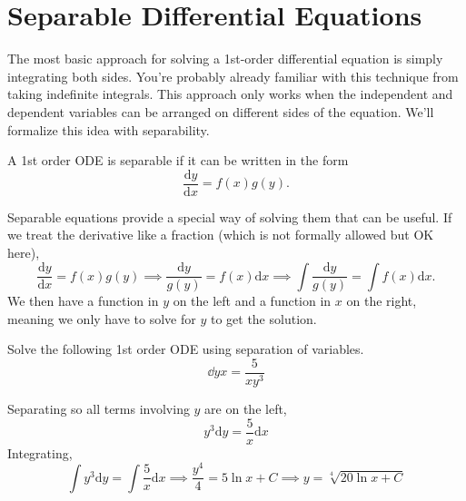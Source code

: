 \section{Separable Differential Equations}
\noindent
The most basic approach for solving a 1st-order differential equation is simply integrating both sides.
You're probably already familiar with this technique from taking indefinite integrals.
This approach only works when the independent and dependent variables can be arranged on different sides of the equation. 
We'll formalize this idea with separability.

\begin{definition}
	A 1st order ODE is separable if it can be written in the form
	\begin{equation*}
		\frac{\mathrm{d} y}{\mathrm{d} x} = f(x)g(y).
	\end{equation*}
\end{definition}

\noindent
Separable equations provide a special way of solving them that can be useful.
If we treat the derivative like a fraction (which is not formally allowed but OK here),
\begin{equation*}
	\frac{\mathrm{d} y}{\mathrm{d} x} = f(x)g(y) \implies \frac{\mathrm{d} y}{g(y)} = f(x) \mathrm{d}x \implies \int{\frac{\mathrm{d} y}{g(y)}} = \int{f(x) \mathrm{d}x}.
\end{equation*}
We then have a function in $y$ on the left and a function in $x$ on the right, meaning we only have to solve for $y$ to get the solution.

\begin{example}
	Solve the following 1st order ODE using separation of variables.
	\begin{equation*}
		\dd{y}{x} = \frac{5}{xy^3}
	\end{equation*}
\end{example}
\noindent
Separating so all terms involving $y$ are on the left,
\begin{equation*}
	y^3 \mathrm{d}y = \frac{5}{x} \mathrm{d}x
\end{equation*}
Integrating,
\begin{equation*}
	\int{y^3 \mathrm{d}y} = \int{\frac{5}{x} \mathrm{d}x} \implies \frac{y^4}{4} = 5\ln{x} + C \implies y = \sqrt[4]{20\ln{x} + C}
\end{equation*}

